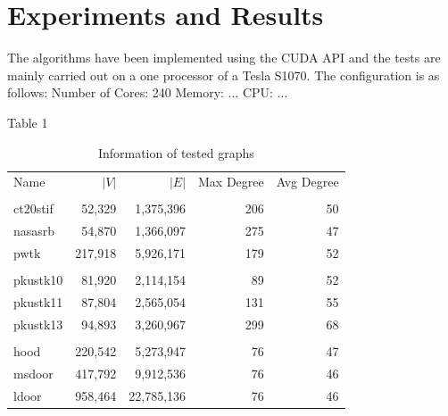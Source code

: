 \documentclass[preprint]{sigplanconf}
\begin{document}
\section{Experiments and Results}
The algorithms have been implemented using the CUDA API and the tests are mainly carried out on a  one processor of a Tesla S1070. The configuration is as follows:
Number of Cores: 240
Memory: ...
CPU: ...

Table 1

\begin{table}
\scriptsize
\begin{center}
\begin{tabular}{l r r r r}
\hline
Name & $|V|$ & $|E|$ & Max Degree & Avg Degree \\
\\
\hline
ct20stif & 52,329 & 1,375,396 & 206 & 50 \\
nasasrb & 54,870 & 1,366,097 & 275 & 47 \\
pwtk  & 217,918 & 5,926,171 & 179 & 52 \\
\\
pkustk10 & 81,920 & 2,114,154 & 89 & 52 \\
pkustk11 & 87,804 & 2,565,054 & 131 & 55 \\
pkustk13 & 94,893 & 3,260,967 & 299 & 68\\
\\
hood & 220,542 & 5,273,947 & 76  & 47 \\
msdoor & 417,792 & 9,912,536 & 76 & 46 \\
ldoor & 958,464 & 22,785,136 & 76 & 46 \\

\end{tabular}
\caption{Information of tested graphs}
\label{amean_time}
\end{center}
\end{table}
\end{document}
